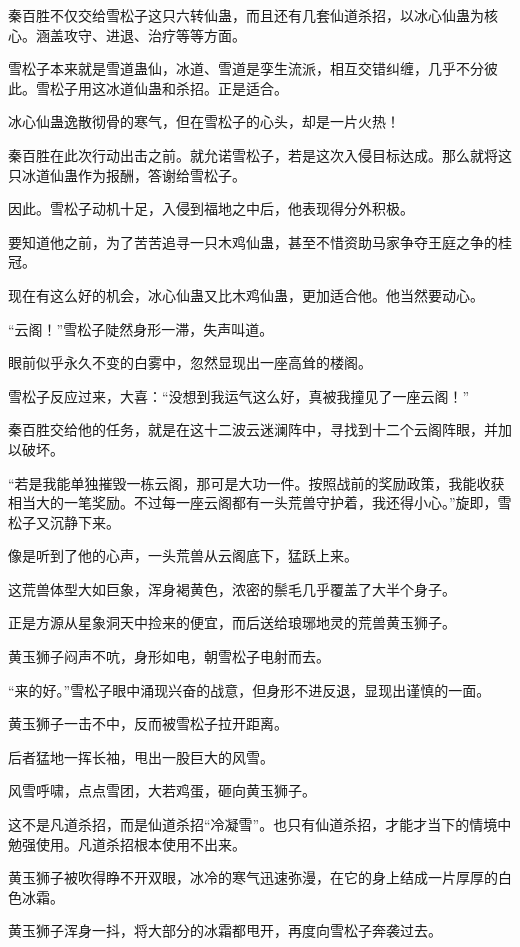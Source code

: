 \begin{this_body}
秦百胜不仅交给雪松子这只六转仙蛊，而且还有几套仙道杀招，以冰心仙蛊为核心。涵盖攻守、进退、治疗等等方面。

雪松子本来就是雪道蛊仙，冰道、雪道是孪生流派，相互交错纠缠，几乎不分彼此。雪松子用这冰道仙蛊和杀招。正是适合。

冰心仙蛊逸散彻骨的寒气，但在雪松子的心头，却是一片火热！

秦百胜在此次行动出击之前。就允诺雪松子，若是这次入侵目标达成。那么就将这只冰道仙蛊作为报酬，答谢给雪松子。

因此。雪松子动机十足，入侵到福地之中后，他表现得分外积极。

要知道他之前，为了苦苦追寻一只木鸡仙蛊，甚至不惜资助马家争夺王庭之争的桂冠。

现在有这么好的机会，冰心仙蛊又比木鸡仙蛊，更加适合他。他当然要动心。

“云阁！”雪松子陡然身形一滞，失声叫道。

眼前似乎永久不变的白雾中，忽然显现出一座高耸的楼阁。

雪松子反应过来，大喜：“没想到我运气这么好，真被我撞见了一座云阁！”

秦百胜交给他的任务，就是在这十二波云迷澜阵中，寻找到十二个云阁阵眼，并加以破坏。

“若是我能单独摧毁一栋云阁，那可是大功一件。按照战前的奖励政策，我能收获相当大的一笔奖励。不过每一座云阁都有一头荒兽守护着，我还得小心。”旋即，雪松子又沉静下来。

像是听到了他的心声，一头荒兽从云阁底下，猛跃上来。

这荒兽体型大如巨象，浑身褐黄色，浓密的鬃毛几乎覆盖了大半个身子。

正是方源从星象洞天中捡来的便宜，而后送给琅琊地灵的荒兽黄玉狮子。

黄玉狮子闷声不吭，身形如电，朝雪松子电射而去。

“来的好。”雪松子眼中涌现兴奋的战意，但身形不进反退，显现出谨慎的一面。

黄玉狮子一击不中，反而被雪松子拉开距离。

后者猛地一挥长袖，甩出一股巨大的风雪。

风雪呼啸，点点雪团，大若鸡蛋，砸向黄玉狮子。

这不是凡道杀招，而是仙道杀招“冷凝雪”。也只有仙道杀招，才能才当下的情境中勉强使用。凡道杀招根本使用不出来。

黄玉狮子被吹得睁不开双眼，冰冷的寒气迅速弥漫，在它的身上结成一片厚厚的白色冰霜。

黄玉狮子浑身一抖，将大部分的冰霜都甩开，再度向雪松子奔袭过去。


\end{this_body}
